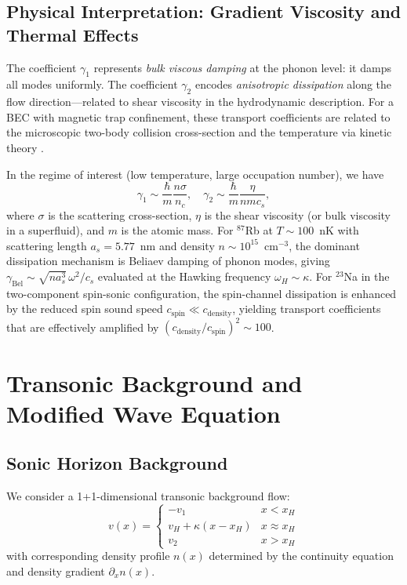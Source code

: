 \documentclass[aps,prl,twocolumn,superscriptaddress,nofootinbib,amsmath,amssymb]{revtex4-2}
\begin{document}
\subsection{Physical Interpretation: Gradient Viscosity and Thermal Effects}

The coefficient $\gamma_1$ represents \textit{bulk viscous damping} at the phonon level: it damps all modes uniformly. The coefficient $\gamma_2$ encodes \textit{anisotropic dissipation} along the flow direction---related to shear viscosity in the hydrodynamic description. For a BEC with magnetic trap confinement, these transport coefficients are related to the microscopic two-body collision cross-section and the temperature via kinetic theory \cite{Zaremba:1999}.

In the regime of interest (low temperature, large occupation number), we have
\begin{equation}
\label{eq:gamma_estimates}
\gamma_1 \sim \frac{\hbar}{m} \frac{n \sigma}{n_c}, \quad \gamma_2 \sim \frac{\hbar}{m} \frac{\eta}{n m c_s},
\end{equation}
where $\sigma$ is the scattering cross-section, $\eta$ is the shear viscosity (or bulk viscosity in a superfluid), and $m$ is the atomic mass. For $^{87}$Rb at $T \sim 100$~nK with scattering length $a_s = 5.77$~nm and density $n \sim 10^{15}$~cm$^{-3}$, the dominant dissipation mechanism is Beliaev damping of phonon modes, giving $\gamma_{\text{Bel}} \sim \sqrt{na_s^3}\,\omega^2/c_s$ evaluated at the Hawking frequency $\omega_H \sim \kappa$. For $^{23}$Na in the two-component spin-sonic configuration, the spin-channel dissipation is enhanced by the reduced spin sound speed $c_{\text{spin}} \ll c_{\text{density}}$, yielding transport coefficients that are effectively amplified by $(c_{\text{density}}/c_{\text{spin}})^2 \sim 100$.

\section{Transonic Background and Modified Wave Equation}
\label{sec:background}

\subsection{Sonic Horizon Background}

We consider a 1+1-dimensional transonic background flow:
\begin{equation}
\label{eq:background_flow}
v(x) = \begin{cases}
-v_1 & x < x_H \\
v_H + \kappa(x - x_H) & x \approx x_H \\
v_2 & x > x_H
\end{cases}
\end{equation}
with corresponding density profile $n(x)$ determined by the continuity equation and density gradient $\partial_x n(x)$.
\end{document}
